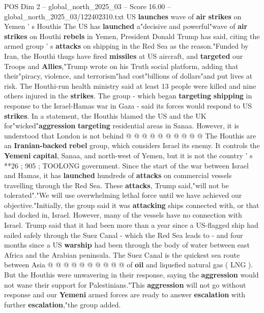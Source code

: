 \begin{textsample}{POS Dim 2 – global\_north\_2025\_03 – Score 16.00 – global\_north\_2025\_03/122402310.txt}  \label{ex:f2_pos_419}
US \textbf{launches} wave of \textbf{air} \textbf{strikes} on Yemen ' s Houthis The US has \textbf{launched} a"decisive and powerful"wave of \textbf{air} \textbf{strikes} on Houthi \textbf{rebels} in Yemen, President Donald Trump has said, citing the armed group ' s \textbf{attacks} on shipping in the Red Sea as the reason."Funded by Iran, the Houthi thugs have fired \textbf{missiles} at US aircraft, and \textbf{targeted} our Troops and \textbf{Allies},"Trump wrote on his Truth social platform, adding that their"piracy, violence, and terrorism"had cost"billions of dollars"and put lives at risk.
The Houthi-run health ministry said at least 13 people were killed and nine others injured in the \textbf{strikes}.
The group - which began \textbf{targeting} \textbf{shipping} in response to the Israel-Hamas war in Gaza - said its forces would respond to US \textbf{strikes}.
In a statement, the Houthis blamed the US and the UK for"wicked"\textbf{aggression} \textbf{targeting} residential areas in Sanaa.
However, it is understood that London is not behind @ @ @ @ @ @ @ @ @ @ The Houthis are an \textbf{Iranian-backed} \textbf{rebel} group, which considers Israel its enemy.
It controls the \textbf{Yemeni} \textbf{capital}, Sanaa, and north-west of Yemen, but it is not the country ' s **26 ; 905 ; TOOLONG government.
Since the start of the war between Israel and Hamas, it has \textbf{launched} hundreds of \textbf{attacks} on commercial vessels travelling through the Red Sea.
These \textbf{attacks}, Trump said,"will not be tolerated"."We will use overwhelming lethal force until we have achieved our objective."Initially, the group said it was \textbf{attacking} ships connected with, or that had docked in, Israel.
However, many of the vessels have no connection with Israel.
Trump said that it had been more than a year since a US-flagged ship had sailed safely through the Suez Canal - which the Red Sea leads to - and four months since a US \textbf{warship} had been through the body of water between east Africa and the Arabian peninsula.
The Suez Canal is the quickest sea route between Asia @ @ @ @ @ @ @ @ @ @ of \textbf{oil} and liquefied natural gas ( LNG ).
But the Houthis were unwavering in their response, saying the \textbf{aggression} would not wane their support for Palestinians."This \textbf{aggression} will not go without response and our \textbf{Yemeni} armed forces are ready to answer \textbf{escalation} with further \textbf{escalation},"the group added.

\end{textsample}
